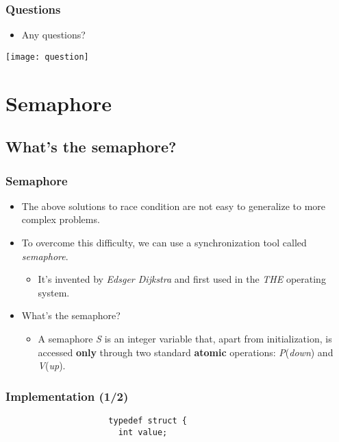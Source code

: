 \documentclass[CJKutf8,dvipsnames,table]{beamer}
\begin{document}
\begin{CJK*}{UTF8}{song}
  \begin{frame}
  \frametitle{Questions}
  \begin{itemize}
  \item{Any questions?}
  \end{itemize}
  \begin{center}
    \texttt{[image: question]}
  \end{center}
  \end{frame}

\section{Semaphore}

\subsection{What's the semaphore?}

  \begin{frame}
  \frametitle{Semaphore} \pause
  \begin{itemize}
  \item{The above solutions to race condition are not easy to generalize to more complex problems.} \pause
  \item{To overcome this difficulty, we can use a synchronization tool called \emph{semaphore}.} \pause
    \begin{itemize}
    \item{It's invented by \textit{Edsger Dijkstra} and first used in the \emph{THE} operating system.} \pause
    \end{itemize}
  \item{What's the semaphore?} \pause
    \begin{itemize}
    \item{A semaphore \emph{S} is an integer variable that, apart from
      initialization, is accessed \textbf{only} through two standard \textbf{atomic} operations: \emph{P}(\emph{down}) and \emph{V}(\emph{up}).}
    \end{itemize}
  \end{itemize}
  \end{frame}

  \begin{frame}[fragile]
  \frametitle{Implementation (1/2)} \pause

\begin{lstlisting}
                     typedef struct {
                       int value;


\end{lstlisting}
\end{frame}
\end{CJK*}
\end{document}
